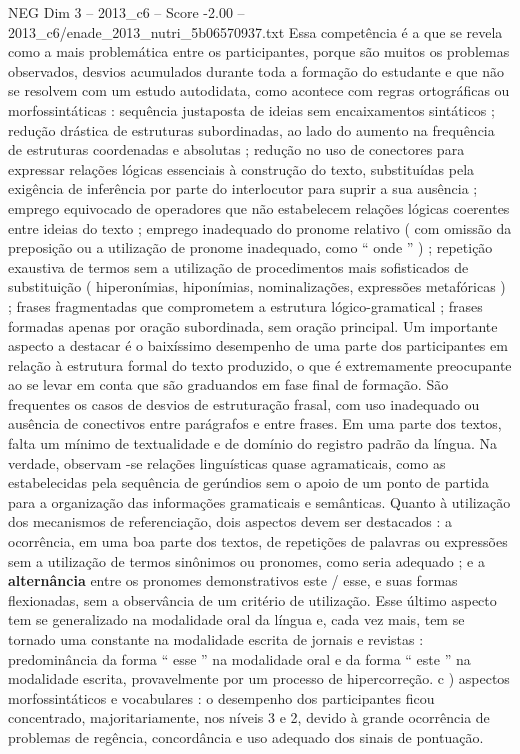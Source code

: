 \begin{textsample}{NEG Dim 3 – 2013\_c6 – Score -2.00 – 2013\_c6/enade\_2013\_nutri\_5b06570937.txt}
Essa competência é a que se revela como a mais problemática entre os participantes, porque são muitos os problemas observados, desvios acumulados durante toda a formação do estudante e que não se resolvem com um estudo autodidata, como acontece com regras ortográficas ou morfossintáticas : sequência justaposta de ideias sem encaixamentos sintáticos ; redução drástica de estruturas subordinadas, ao lado do aumento na frequência de estruturas coordenadas e absolutas ; redução no uso de conectores para expressar relações lógicas essenciais à construção do texto, substituídas pela exigência de inferência por parte do interlocutor para suprir a sua ausência ; emprego equivocado de operadores que não estabelecem relações lógicas coerentes entre ideias do texto ; emprego inadequado do pronome relativo ( com omissão da preposição ou a utilização de pronome inadequado, como “ onde ” ) ; repetição exaustiva de termos sem a utilização de procedimentos mais sofisticados de substituição ( hiperonímias, hiponímias, nominalizações, expressões metafóricas ) ; frases fragmentadas que comprometem a estrutura lógico-gramatical ; frases formadas apenas por oração subordinada, sem oração principal.
Um importante aspecto a destacar é o baixíssimo desempenho de uma parte dos participantes em relação à estrutura formal do texto produzido, o que é extremamente preocupante ao se levar em conta que são graduandos em fase final de formação.
São frequentes os casos de desvios de estruturação frasal, com uso inadequado ou ausência de conectivos entre parágrafos e entre frases.
Em uma parte dos textos, falta um mínimo de textualidade e de domínio do registro padrão da língua.
Na verdade, observam -se relações linguísticas quase agramaticais, como as estabelecidas pela sequência de gerúndios sem o apoio de um ponto de partida para a organização das informações gramaticais e semânticas.
Quanto à utilização dos mecanismos de referenciação, dois aspectos devem ser destacados : a ocorrência, em uma boa parte dos textos, de repetições de palavras ou expressões sem a utilização de termos sinônimos ou pronomes, como seria adequado ; e a \textbf{alternância} entre os pronomes demonstrativos este / esse, e suas formas flexionadas, sem a observância de um critério de utilização.
Esse último aspecto tem se generalizado na modalidade oral da língua e, cada vez mais, tem se tornado uma constante na modalidade escrita de jornais e revistas : predominância da forma “ esse ” na modalidade oral e da forma “ este ” na modalidade escrita, provavelmente por um processo de hipercorreção. c ) aspectos morfossintáticos e vocabulares : o desempenho dos participantes ficou concentrado, majoritariamente, nos níveis 3 e 2, devido à grande ocorrência de problemas de regência, concordância e uso adequado dos sinais de pontuação.

\end{textsample}
